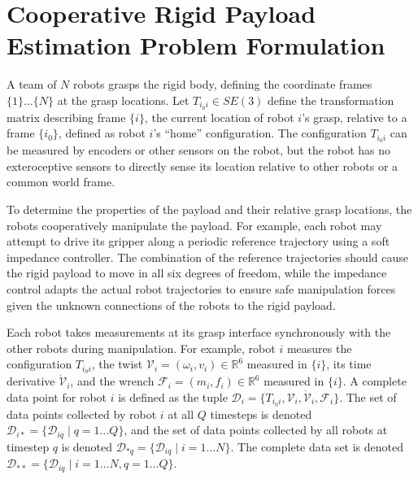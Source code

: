 \documentclass[letterpaper, 10 pt, journal, twoside]{IEEEtran}
\newcommand{\real}{\mathbb{R}}
\newcommand{\wrench}{{\mathcal F}}
\newcommand{\twist}{{\mathcal V}}
\begin{document}
\section{Cooperative Rigid Payload Estimation Problem Formulation}
A team of $N$ robots grasps the rigid body, defining the coordinate frames $\{1\}\ldots \{N\}$ at the grasp locations. Let $T_{i_{0}i} \in SE(3)$ define the transformation matrix describing frame $\{i\}$, the current location of robot $i$'s grasp, relative to a frame $\{i_0\}$, defined as robot $i$'s ``home'' configuration. The configuration
$T_{i_{0}i}$ can be measured by encoders or other sensors on the robot, but the robot has no exteroceptive sensors to directly sense its location relative to other robots or a common world frame.

To determine the properties of the payload and their relative grasp locations, the robots cooperatively manipulate the payload. For example, each robot may attempt to drive its gripper along a periodic reference trajectory using a soft impedance controller. The combination of the reference trajectories should cause the rigid payload to move in all six degrees of freedom, while the impedance control adapts the actual robot trajectories to ensure safe manipulation forces given the unknown connections of the robots to the rigid payload. 

Each robot takes measurements at its grasp interface synchronously with the other robots during manipulation. For example, robot $i$ measures the configuration $T_{i_0i}$, the twist $\twist_i = (\omega_i,v_i) \in \real^6$ measured in $\{i\}$, its time derivative $\dot{\twist}_i$, and the wrench $\wrench_i = (m_i,f_i) \in \real^6$ measured in $\{i\}$. A complete data point for robot $i$ is defined as the tuple $\mathcal{D}_i = \{T_{i_0i}, \twist_{i},\dot{\twist}_{i}, \wrench_{i}\}$.  The set of data points collected by robot $i$ at all $Q$ timesteps is denoted $\mathcal{D}_{i*} = \{ \mathcal{D}_{iq} \; | \; q = 1 \ldots Q \}$, and the set of data points collected by all robots at timestep $q$ is denoted $\mathcal{D}_{*q} = \{ \mathcal{D}_{iq} \; | \; i = 1 \ldots N \}.$ The complete data set is denoted $\mathcal{D}_{**} = \{ \mathcal{D}_{iq} \; | \; i = 1 \ldots N, q = 1 \ldots Q\}$.

\end{document}
